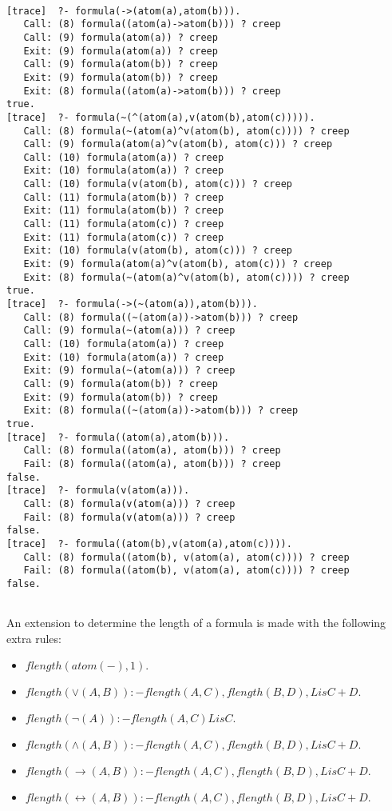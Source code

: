 \documentclass[fullpage]{article}
\begin{document}
 \\
\begin{verbatim}
[trace]  ?- formula(->(atom(a),atom(b))).
   Call: (8) formula((atom(a)->atom(b))) ? creep
   Call: (9) formula(atom(a)) ? creep
   Exit: (9) formula(atom(a)) ? creep
   Call: (9) formula(atom(b)) ? creep
   Exit: (9) formula(atom(b)) ? creep
   Exit: (8) formula((atom(a)->atom(b))) ? creep
true.
[trace]  ?- formula(~(^(atom(a),v(atom(b),atom(c))))).
   Call: (8) formula(~(atom(a)^v(atom(b), atom(c)))) ? creep
   Call: (9) formula(atom(a)^v(atom(b), atom(c))) ? creep
   Call: (10) formula(atom(a)) ? creep
   Exit: (10) formula(atom(a)) ? creep
   Call: (10) formula(v(atom(b), atom(c))) ? creep
   Call: (11) formula(atom(b)) ? creep
   Exit: (11) formula(atom(b)) ? creep
   Call: (11) formula(atom(c)) ? creep
   Exit: (11) formula(atom(c)) ? creep
   Exit: (10) formula(v(atom(b), atom(c))) ? creep
   Exit: (9) formula(atom(a)^v(atom(b), atom(c))) ? creep
   Exit: (8) formula(~(atom(a)^v(atom(b), atom(c)))) ? creep
true.
[trace]  ?- formula(->(~(atom(a)),atom(b))).
   Call: (8) formula((~(atom(a))->atom(b))) ? creep
   Call: (9) formula(~(atom(a))) ? creep
   Call: (10) formula(atom(a)) ? creep
   Exit: (10) formula(atom(a)) ? creep
   Exit: (9) formula(~(atom(a))) ? creep
   Call: (9) formula(atom(b)) ? creep
   Exit: (9) formula(atom(b)) ? creep
   Exit: (8) formula((~(atom(a))->atom(b))) ? creep
true.
[trace]  ?- formula((atom(a),atom(b))).
   Call: (8) formula((atom(a), atom(b))) ? creep
   Fail: (8) formula((atom(a), atom(b))) ? creep
false.
[trace]  ?- formula(v(atom(a))).
   Call: (8) formula(v(atom(a))) ? creep
   Fail: (8) formula(v(atom(a))) ? creep
false.
[trace]  ?- formula((atom(b),v(atom(a),atom(c)))).
   Call: (8) formula((atom(b), v(atom(a), atom(c)))) ? creep
   Fail: (8) formula((atom(b), v(atom(a), atom(c)))) ? creep
false.


\end{verbatim}
An extension to determine the length of a formula is made with the following extra rules:
\begin{itemize}
\item {\em $flength(atom(-), 1).$}
\item {\em $flength(\vee(A, B)):-flength(A, C),flength(B, D),L is C+D.$}
\item {\em $flength(\neg(A)):-flength(A, C)L is C.$}
\item {\em $flength(\wedge(A, B)):-flength(A, C),flength(B, D),L is C+D.$}
\item {\em $flength(\rightarrow(A, B)):-flength(A, C),flength(B, D),L is C+D.$}
\item {\em $flength(\leftrightarrow(A, B)):-flength(A, C),flength(B, D),L is C+D.$}
\end{itemize}
\end{document}
